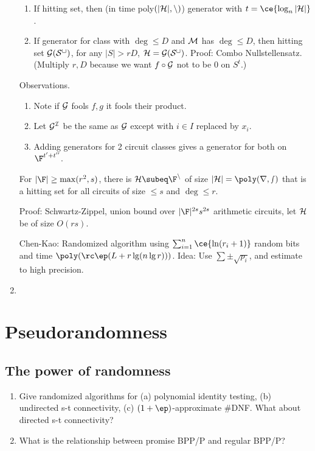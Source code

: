 \begin{enumerate}
\begin{lem}
\begin{enumerate}
\item
If hitting set, then (in time poly$(|\cal H|,n)$) generator with $t=\ce{\log_n|\cal H|}$.
\item
If generator for class with $\deg\le D$ and $\cal M$ has $\deg\le D$, then hitting set $\cal G(S^t)$, for any $|S|>rD$, $\cal H=\cal G(S^t)$. Proof: Combo Nullstellensatz. (Multiply $r,D$ because we want $f\circ \cal G$ not to be 0 on $S^t$.)
\end{enumerate}
\end{lem}
Observations.
\begin{enumerate}
\item
Note if $\cal G$ fools $f,g$ it fools their product.
\item Let $\cal G^I$ be the same as $\cal G$ except with $i\in I$ replaced by $x_i$. 
\item Adding generators for 2 circuit classes gives a generator for both on $\F^{t'+t''}$.
\end{enumerate}
For $|\F|\ge \max(r^2,s)$, there is $\cal H\subeq \F^n$ of size $|\cal H|=\poly(r,s)$ that is a hitting set for all circuits of size $\le s$ and $\deg \le r$. 

Proof: Schwartz-Zippel, union bound over $|\F|^{2s}s^{2s}$ arithmetic circuits, let $\cal H$ be of size $O(rs)$.


Chen-Kao: Randomized algorithm using $\sum_{i=1}^n \ce{\ln(r_i+1)}$ random bits and time $\poly(\rc\ep (L+r\lg(n\lg r)))$. Idea: Use $\sum\pm\sqrt{p_i}$, and estimate to high precision.
\item 
\end{enumerate}

\section{Pseudorandomness}

\subsection{}
\subsection{The power of randomness}
\begin{enumerate}
\item
Give randomized algorithms for (a) polynomial identity testing, (b) undirected s-t connectivity, (c) $(1+\ep)$-approximate \#DNF. What about directed s-t connectivity?
\item What is the relationship between promise BPP/P and regular BPP/P?
\end{enumerate}
